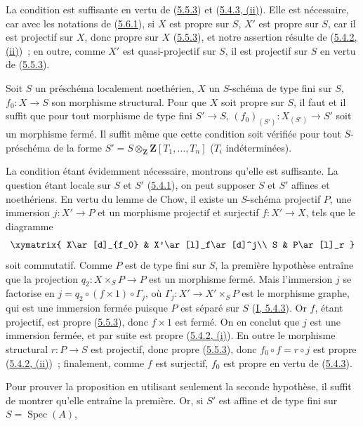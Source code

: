 La condition est suffisante en vertu de (\hyperref[II.5.5.3-fr]{5.5.3}) et
(\hyperref[II.5.4.3-fr]{5.4.3, (ii)}). Elle est nécessaire, car avec les
notations de (\hyperref[II.5.6.1-fr]{5.6.1}), si $X$ est propre sur $S$, $X'$
est propre sur $S$, car il est projectif sur $X$, donc propre sur $X$
(\hyperref[II.5.5.3-fr]{5.5.3}), et notre assertion résulte de
(\hyperref[II.5.4.2-fr]{5.4.2, (ii)})~; en outre, comme $X'$ est
quasi-projectif sur $S$, il est projectif sur $S$ en vertu de
(\hyperref[II.5.5.3-fr]{5.5.3}).

\begin{corollary}[5.6.3]
\label{II.5.6.3-fr}
Soit $S$ un préschéma localement noethérien, $X$ un $S$-schéma de type fini
sur $S$, $f_0:X\to S$ son morphisme structural. Pour que $X$ soit propre sur
$S$, il faut et il suffit que pour tout morphisme de type fini $S'\to S$,
$(f_0)_{(S')}:X_{(S')}\to S'$ soit un morphisme fermé. Il suffit même que
cette condition soit vérifiée pour tout $S$-préschéma de la forme
$S'=S\otimes_{\mathbf Z}\mathbf Z[T_1,\ldots,T_n]$ ($T_i$ indéterminées).
\end{corollary}

La condition étant évidemment nécessaire, montrons qu'elle est suffisante.
La question étant locale sur $S$ et $S'$ (\hyperref[II.5.4.1-fr]{5.4.1}), on
peut supposer $S$ et $S'$ affines et noethériens. En vertu du lemme de Chow,
il existe un $S$-schéma projectif $P$, une immersion $j:X'\to P$ et un
morphisme projectif et surjectif $f:X'\to X$, tels que le diagramme
\[
\xymatrix{
X\ar[d]_{f_0} & X'\ar[l]_f\ar[d]^j\\
S & P\ar[l]_r
}
\]
soit commutatif. Comme $P$ est de type fini sur $S$, la première hypothèse
entraîne que la projection $q_2:X\times_SP\to P$ est un morphisme fermé. Mais
l'immersion $j$ se factorise en $j=q_2\circ(f\times1)\circ\Gamma_j$,
où $\Gamma_j:X'\to X'\times_SP$ est le morphisme graphe, qui est une
immersion fermée puisque $P$ est séparé sur $S$
(\hyperref[I.5.4.3-fr]{I, 5.4.3}). Or $f$, étant projectif, est propre
(\hyperref[II.5.5.3-fr]{5.5.3}), donc $f\times1$ est fermé. On en conclut que
$j$ est une immersion fermée, et par suite est propre
(\hyperref[II.5.4.2-fr]{5.4.2, (i)}). En outre le morphisme structural
$r:P\to S$ est projectif, donc propre (\hyperref[II.5.5.3-fr]{5.5.3}), donc
$f_0\circ f=r\circ j$ est propre
(\hyperref[II.5.4.2-fr]{5.4.2, (ii)})~; finalement, comme $f$ est surjectif,
$f_0$ est propre en vertu de (\hyperref[II.5.4.3-fr]{5.4.3}).

Pour prouver la proposition en utilisant seulement la seconde hypothèse, il
suffit de montrer qu'elle entraîne la première. Or, si $S'$ est affine et de
type fini sur $S=\operatorname{Spec}(A)$,

